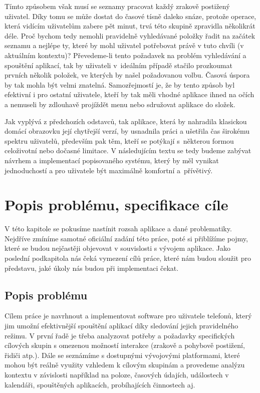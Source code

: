 \documentclass[thesis=M,czech]{FITthesis}[2012/06/26]
\begin{document}
\begin{introduction}
Tímto způsobem však musí se seznamy pracovat každý zrakově postižený uživatel. Díky tomu se může dostat do časové tísně daleko snáze, protože operace, která vidícím uživatelům zabere pět minut, trvá této skupině zpravidla několikrát déle. Proč bychom tedy nemohli pravidelně vyhledávané položky řadit na začátek seznamu a nejlépe ty, které by mohl uživatel potřebovat právě v tuto chvíli (v aktuálním kontextu)? Převedeme-li tento požadavek na problém vyhledávání a spouštění aplikací, tak by uživateli v~ideálním případě stačilo prozkoumat prvních několik položek, ve kterých by našel požadovanou volbu. Časová úspora by tak mohla být velmi znatelná. Samozřejmostí je, že by tento způsob byl efektivní i pro ostatní uživatele, kteří by tak měli vhodné aplikace ihned na očích a nemuseli by zdlouhavě projíždět menu nebo sdružovat aplikace do složek.

Jak vyplývá z předchozích odstavců, tak aplikace, která by nahradila klasickou domácí obrazovku její chytřejší verzí, by usnadnila práci a ušetřila čas širokému spektru uživatelů, především pak těm, kteří se potýkají s~některou formou celoživotní nebo dočasné limitace. V následujícím textu se tedy budeme zabývat návrhem a implementací popisovaného systému, který by měl vynikat jednoduchostí a pro uživatele být maximálně komfortní a~přívětivý.

\section{Popis problému, specifikace cíle}

V této kapitole se pokusíme nastínit rozsah aplikace a dané problematiky. Nejdříve zmíníme samotné oficiální zadání této práce, poté si přiblížíme pojmy, které se budou nejčastěji objevovat v souvislosti s vývojem aplikace. Jako poslední podkapitola nás čeká vymezení cílů práce, které nám budou sloužit pro představu, jaké úkoly nás budou při implementaci čekat.

\subsection{Popis problému}

Cílem práce je navrhnout a implementovat software pro uživatele  telefonů, který jim umožní efektivnější spouštění aplikací díky sledování jejich pravidelného režimu. V první řadě je třeba analyzovat potřeby a požadavky specifických cílových skupin s omezenou možností interakce (zrakově a pohybově postižení, řidiči atp.). Dále se seznámíme s dostupnými vývojovými platformami, které mohou být reálně využity vzhledem k cílovým skupinám a provedeme analýzu kontextu v závislosti například na poloze, časových údajích, událostech v kalendáři, spouštěných aplikacích, probíhajících činnostech aj.


\end{introduction}
\end{document}
